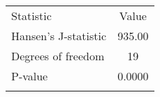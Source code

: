 \begin{center}
\begin{tabular}{lc}
\hline \noalign{\smallskip}Statistic & Value\\
\noalign{\smallskip}\hline \noalign{\smallskip}Hansen's J-statistic & 935.00\\
Degrees of freedom & 19\\
P-value & 0.0000\\
\noalign{\smallskip}\hline\end{tabular}\\
\end{center}

